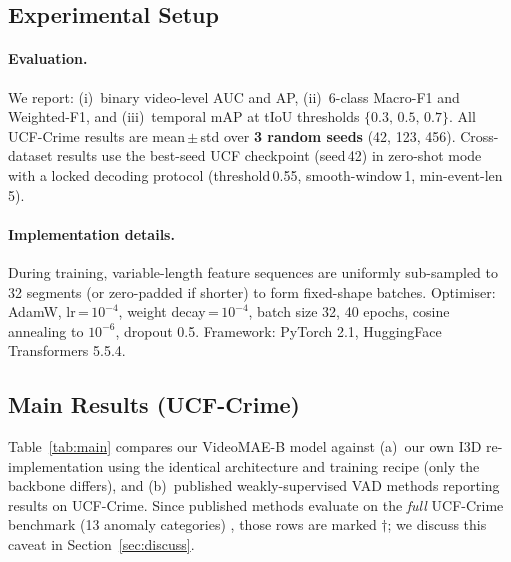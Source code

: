 \documentclass[11pt]{article}
\begin{document}
\subsection{Experimental Setup}

\paragraph{Evaluation.}
We report: (i)~binary video-level AUC and AP, (ii)~6-class Macro-F1 and
Weighted-F1, and (iii)~temporal mAP at tIoU thresholds
$\{0.3,\,0.5,\,0.7\}$.
All UCF-Crime results are mean\,$\pm$\,std over \textbf{3 random seeds}
(42, 123, 456). Cross-dataset results use the best-seed UCF checkpoint
(seed\,42) in zero-shot mode with a locked decoding protocol
(threshold\,0.55, smooth-window\,1, min-event-len\,5).

\paragraph{Implementation details.}
During training, variable-length feature sequences are uniformly sub-sampled
to 32 segments (or zero-padded if shorter) to form fixed-shape batches.
Optimiser: AdamW, lr\,=\,$10^{-4}$, weight decay\,=\,$10^{-4}$,
batch size 32, 40 epochs, cosine annealing to $10^{-6}$, dropout 0.5.
Framework: PyTorch 2.1, HuggingFace Transformers 5.5.4.

\subsection{Main Results (UCF-Crime)}

Table~\ref{tab:main} compares our VideoMAE-B model against (a)~our own I3D
re-implementation using the identical architecture and training recipe
(only the backbone differs), and (b)~published weakly-supervised VAD methods
reporting results on UCF-Crime.
Since published methods evaluate on the \emph{full} UCF-Crime benchmark
(13 anomaly categories) \citep{sultani2018real}, those rows are marked
$\dagger$; we discuss this caveat in Section~\ref{sec:discuss}.
\end{document}
